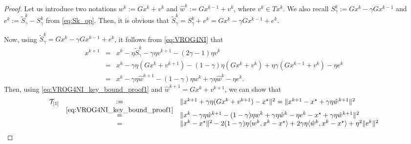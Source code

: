 \documentclass{article}
\newcommand{\norms}[1]{\Vert#1\Vert}
\newcommand{\iprods}[1]{\langle #1\rangle}
\newcommand{\Tc}{\mathcal{T}}
\theoremstyle{plain}
\theoremstyle{definition}
\theoremstyle{remark}
\begin{document}
\begin{proof}
Let us introduce two notations $w^k := Gx^k + v^k$ and $\hat{w}^k := Gx^{k-1} + v^k$, where $v^k \in Tx^k$.
We also recall $S^k_{\gamma} := Gx^k - \gamma Gx^{k-1}$ and $e^k := \widetilde{S}^k_{\gamma} - S_{\gamma}^k$ from \eqref{eq:Sk_op}.
Then, it is obvious that $\widetilde{S}^k_{\gamma} = S_{\gamma}^k + e^k = Gx^k - \gamma Gx^{k-1} + e^k$.

Now, using $\widetilde{S}^k_{\gamma} =  Gx^k - \gamma Gx^{k-1} + e^k$, it follows from \eqref{eq:VROG4NI} that
\begin{equation}\label{eq:VROG4NI_key_bound_proof1} 
\begin{array}{lcl}
x^{k+1}  & = & x^k - \eta  \widetilde{S}_{\gamma}^k - \gamma\eta  v^{k+1} - (2\gamma - 1)\eta v^k \\
& = & x^k - \gamma\eta(Gx^k + v^{k+1}) -  (1-\gamma)\eta ( Gx^k + v^k) + \eta\gamma ( Gx^{k-1} +  v^k) -  \eta e^k \\
& = & x^k - \gamma\eta\hat{w}^{k+1} -   (1-\gamma)\eta w^k + \gamma\eta \hat{w}^k -  \eta e^k.
\end{array} 
\end{equation}
Then, using \eqref{eq:VROG4NI_key_bound_proof1} and $\hat{w}^{k+1} = Gx^k + v^{k+1}$, we can show that
\begin{equation*} 
\begin{array}{lcl}
\Tc_{[1]} &:= & \norms{x^{k+1} + \gamma\eta(Gx^{k} + v^{k+1}) - x^{\star}}^2 = \norms{x^{k+1} - x^{\star} + \gamma \eta \hat{w}^{k+1}}^2 \\
& \overset{\tiny\eqref{eq:VROG4NI_key_bound_proof1}}{ = } & \norms{ x^k - \gamma \eta \hat{w}^{k+1} -  (1-\gamma)\eta w^k + \gamma \eta \hat{w}^k -  \eta e^k - x^{\star} + \gamma \eta \hat{w}^{k+1} }^2 \\
& = & \norms{x^k - x^{\star}}^2  - 2(1-\gamma)\eta \iprods{w^k, x^k - x^{\star}} + 2\gamma\eta\iprods{\hat{w}^k, x^k - x^{\star}}  + \eta^2\norms{e^k}^2 \\

\end{array}
\end{equation*}
\end{proof}
\end{document}
